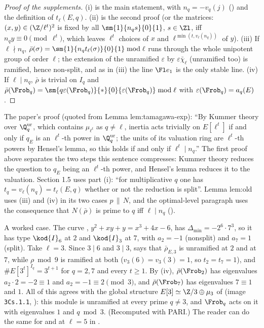 \begin{proof}[Proof of the supplements]
(i) is the main statement, with $n_q=-v_q(j)$ () and the definition of $t_\ell(E,q)$. (ii) is the second proof (or the
matrices: $(x,y)\in(\Z/\ell^t)^2$ is fixed by all $\sm{1}{n_qs}{0}{1}$, $s\in\Zl$, iff $n_qy\equiv0\pmod{\ell^t}$, which leaves $\ell^t$ choices of $x$ and
$\ell^{\min(t,v_\ell(n_q))}$ of $y$). (iii) If $\ell\nmid n_q$, $\bar\rho(\sigma)=\sm{1}{n_qt_\ell(\sigma)}{0}{1}\bmod\ell$ runs through the whole unipotent group of order
$\ell$; the extension of the unramified $\varepsilon$ by $\varepsilon\bar\chi_\ell$ (unramified too) is ramified, hence non-split, and as in
(iii) the line $\Fl e_1$ is the only stable line. (iv) If $\ell\mid n_q$, $\bar\rho$ is trivial on $I_q$ and
$\bar\rho(\Frob_q)=\sm{q\varepsilon(\Frob_q)}{*}{0}{\varepsilon(\Frob_q)}\bmod\ell$ with $\varepsilon(\Frob_q)=a_q(E)$.
\end{proof}

\begin{paperlink}
The paper's proof (quoted from Lemma lem:tamagawa-exp): ``By Kummer theory over $\Q_q^{\mathrm{ur}}$, which contains $\mu_{\ell^t}$ as $q\ne\ell$,
inertia acts trivially on $E[\ell^t]$ if and only if $q_E$ is an $\ell^t$-th power in $\Q_q^{\mathrm{ur}}$; the units of its valuation ring are $\ell^t$-th
powers by Hensel's lemma, so this holds if and only if $\ell^t\mid n_q$.'' The first proof above separates the two steps this sentence
compresses: Kummer theory reduces the question to $q_E$ being an $\ell^t$-th power, and Hensel's lemma reduces it to the valuation. Section 1.5
uses part (i): ``for multiplicative $q$ one has $t_q=v_\ell(n_q)=t_\ell(E,q)$ whether or not the reduction is split''. Lemma lem:old uses (iii)
and (iv) in its two cases $p\,\|\,N$, and the optimal-level paragraph uses the consequence that $N(\bar\rho)$ is prime to $q$ iff $\ell\mid n_q$
().
\end{paperlink}

A worked case. The curve , $y^2+xy+y=x^3+4x-6$, has $\Delta_{\min}=-2^6\cdot7^3$, so it has type $\kod{I}_6$ at $2$ and $\kod{I}_3$ at $7$, with $a_2=-1$ (nonsplit) and
$a_7=1$ (split). Take $\ell=3$. Since $3\mid6$ and $3\mid3$,  says that $\bar\rho_{E,3}$ is unramified at $2$ and at $7$, while $\rho\bmod9$ is
ramified at both ($v_3(6)=v_3(3)=1$, so $t_2=t_7=1$), and $\#E[3^t]^{I_q}=3^{t+1}$ for $q=2,7$ and every $t\ge1$. By (iv), $\bar\rho(\Frob_2)$ has eigenvalues
$a_2\cdot2=-2\equiv1$ and $a_2=-1\equiv2\pmod3$, and $\bar\rho(\Frob_7)$ has eigenvalues $7\equiv1$ and $1$. All of this agrees with the global structure
$E[3]\simeq\Z/3\oplus\mu_3$ of  (image \texttt{3Cs.1.1}, ): this module is unramified at every prime $q\ne3$, and $\Frob_q$
acts on it with eigenvalues $1$ and $q\bmod3$. (Recomputed with PARI.) The reader can do the same for  and  at $\ell=5$ in
.

